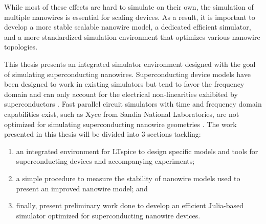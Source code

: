 While most of these effects are hard to simulate on their own, the simulation of multiple nanowires
is essential for scaling devices. As a result, it is important to develop 
a more stable scalable nanowire model, a dedicated efficient simulator, and a more standardized 
simulation environment that optimizes various nanowire topologies.

This thesis presents an integrated simulator environment designed with the goal of simulating
superconducting nanowires. Superconducting device
models have been designed to work in existing simulators
but tend to favor the frequency domain and can  
only account for 
the electrical non-linearities exhibited by superconductors \cite{josephsoncircsjl, wrspice}. 
Fast parallel circuit simulators with time and frequency domain capabilities
exist, such as Xyce from Sandia National Laboratories, are not optimized
for simulating superconducting nanowire geometries \cite{xyce_reference}.
The work presented in this thesis will be divided into 3 sections tackling: 
\begin{enumerate}
    \item an integrated environment for LTspice to design specific models and tools for superconducting 
    devices and accompanying experiments;
    \item a simple procedure to measure the stability of nanowire models used to 
    present an improved nanowire model; and
    \item finally, present preliminary work done to develop an efficient Julia-based simulator
    optimized for superconducting nanowire devices.
\end{enumerate}




